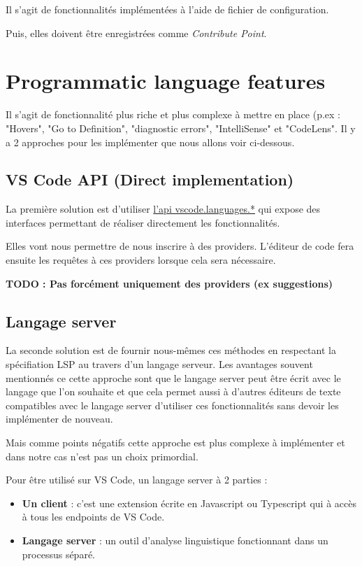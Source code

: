 \documentclass[
    iict, %
    il, %
]{heig-tb}
\begin{document}
Il s'agit de fonctionnalités implémentées à l'aide de fichier de configuration.

Puis, elles doivent être enregistrées comme \emph{Contribute Point}.

\section{Programmatic language features}\label{Programmatic language features}
Il s'agit de fonctionnalité plus riche et plus complexe à mettre en place (p.ex : "Hovers", "Go to Definition", "diagnostic errors", "IntelliSense" \space et "CodeLens".
Il y a 2 approches pour les implémenter que nous allons voir ci-dessous.

\subsection{VS Code API (Direct implementation)}
La première solution est d'utiliser \href{https://code.visualstudio.com/api/references/vscode-api#languages}{l'api vscode.languages.*} qui expose des interfaces
permettant de réaliser directement les fonctionnalités.

Elles vont nous permettre de nous inscrire à des providers. L'éditeur de code fera ensuite les requêtes à ces providers lorsque cela sera nécessaire.

\textbf{TODO : Pas forcément uniquement des providers (ex suggestions)}

\subsection{Langage server}
La seconde solution est de fournir nous-mêmes ces méthodes en respectant la spécifiation LSP \cite{lsp-specification} au travers d'un langage serveur.
Les avantages souvent mentionnés ce cette approche sont que le langage server peut être écrit avec le langage que l'on souhaite et
que cela permet aussi à d'autres éditeurs de texte compatibles avec le langage server d'utiliser ces fonctionnalités sans devoir les implémenter de nouveau.

Mais comme points négatifs cette approche est plus complexe à implémenter et dans notre cas n'est pas un choix primordial.

Pour être utilisé sur VS Code, un langage server à 2 parties :
\begin{itemize}
    \item \textbf{Un client} : c'est une extension écrite en Javascript ou Typescript qui à accès à tous les endpoints de VS Code.
    \item \textbf{Langage server} : un outil d'analyse linguistique fonctionnant dans un processus séparé.
\end{itemize}
\end{document}
